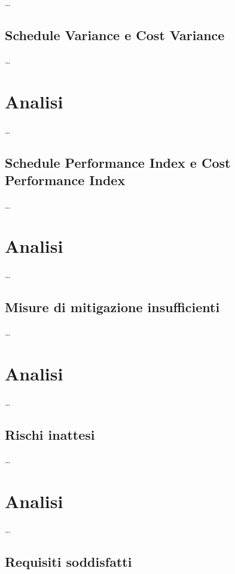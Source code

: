 \dots



\subsection{Schedule Variance e Cost Variance}

\dots

\section*{Analisi}

\dots



\subsection{Schedule Performance Index e Cost Performance Index}

\dots

\section*{Analisi}

\dots



\subsection{Misure di mitigazione insufficienti}

\dots

\section*{Analisi}

\dots



\subsection{Rischi inattesi}

\dots

\section*{Analisi}

\dots



\subsection{Requisiti soddisfatti}
\label{subsec:Requisiti soddisfatti}

